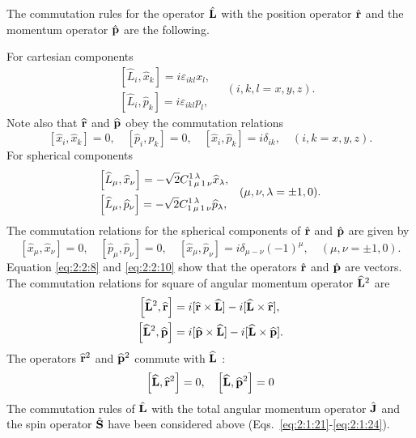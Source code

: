 The commutation rules for the operator $\hat{\mathbf{L}}$ with the position operator $\hat{\mathbf{r}}$ and the momentum operator $\hat{\mathbf{p}}$ are the following.

For cartesian components
\begin{equation}
\begin{aligned}
& {\left[\hat{L}_{i}, \hat{x}_{k}\right]=i \varepsilon_{i k l} x_{l},}\\
& {\left[\widehat{L}_{i}, \hat{p}_{k}\right]=i \varepsilon_{i k l} p_{l}, } 
\end{aligned} \quad(i, k, l=x, y, z). \label{eq:2:2:8}
\end{equation}
Note also that $\widehat{\mathbf{r}}$ and $\widehat{\mathbf{p}}$ obey the commutation relations
\begin{equation}
\left[\widehat{x}_{i}, \widehat{x}_{k}\right]=0, \quad\left[\widehat{p}_{i}, \widehat{p}_{k}\right]=0, \quad\left[\widehat{x}_{i}, \widehat{p}_{k}\right]=i \delta_{i k}, \quad(i, k=x, y, z) .\label{eq:2:2:9}
\end{equation}
For spherical components
\begin{equation}
\begin{aligned}
& {\left[\widehat{L}_{\mu}, \widehat{x}_{\nu}\right]=-\sqrt{2} C_{1\,\mu\,1\,\nu}^{1\,\lambda} \widehat{x}_{\lambda},} \\
& {\left[\widehat{L}_{\mu}, \widehat{p}_{\nu}\right]=-\sqrt{2} C_{1\,\mu\,1\,\nu}^{1\,\lambda} \widehat{p}_{\lambda},} 
\end{aligned}  \quad(\mu, \nu, \lambda= \pm 1,0) .\label{eq:2:2:10}
\end{equation}
The commutation relations for the spherical components of $\hat{\mathbf{r}}$ and $\hat{\mathbf{p}}$ are given by
\begin{equation}
\left[\widehat{x}_{\mu}, \widehat{x}_{\nu}\right]=0, \quad\left[\widehat{p}_{\mu}, \widehat{p}_{\nu}\right]=0, \quad\left[\widehat{x}_{\mu}, \widehat{p}_{\nu}\right]=i \delta_{\mu-\nu}(-1)^{\mu}, \quad(\mu, \nu= \pm 1,0) .\label{eq:2:2:11}
\end{equation}
Equation \eqref{eq:2:2:8} and \eqref{eq:2:2:10} show that the operators $\hat{\mathbf{r}}$ and $\hat{\mathbf{p}}$ are vectors.\\
The commutation relations for square of angular momentum operator $\widehat{\mathbf{L}}^{2}$ are
\begin{align}
{\left[\widehat{\mathbf{L}}^{2}, \widehat{\mathbf{r}}\right] } & =i[\widehat{\mathbf{r}} \times \widehat{\mathbf{L}}]-i[\widehat{\mathbf{L}} \times \widehat{\mathbf{r}}]  ,\notag\\
{\left[\widehat{\mathbf{L}}^{2}, \widehat{\mathbf{p}}\right] } & =i[\widehat{\mathbf{p}} \times \widehat{\mathbf{L}}]-i[\widehat{\mathbf{L}} \times \widehat{\mathbf{p}}] .\label{eq:2:2:12}
\end{align}
The operators $\widehat{\mathbf{r}}^{2}$ and $\widehat{\mathbf{p}}^{2}$ commute with $\widehat{\mathbf{L}}$ :
\[
\left[\widehat{\mathbf{L}}, \widehat{\mathbf{r}}^{2}\right]=0, \quad\left[\widehat{\mathbf{L}}, \widehat{\mathbf{p}}^{2}\right]=0
\]
The commutation rules of $\hat{\mathbf{L}}$ with the total angular momentum operator $\hat{\mathbf{J}}$ and the spin operator $\hat{\mathbf{S}}$ have been considered above (Eqs.~\eqref{eq:2:1:21}-\eqref{eq:2:1:24}).


